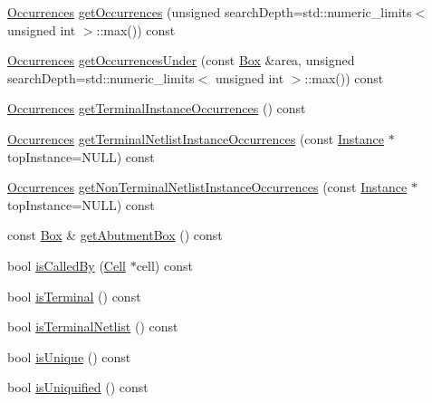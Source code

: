 \begin{DoxyCompactItemize}
\mbox{\hyperlink{namespaceHurricane_a1912927c128eee859af62dbe4cbe0a6b}{Occurrences}} \mbox{\hyperlink{classHurricane_1_1Cell_ab5bbab0a59106855d61deb94805e6115}{get\+Occurrences}} (unsigned search\+Depth=std\+::numeric\+\_\+limits$<$ unsigned int $>$\+::max()) const
\item 
\mbox{\hyperlink{namespaceHurricane_a1912927c128eee859af62dbe4cbe0a6b}{Occurrences}} \mbox{\hyperlink{classHurricane_1_1Cell_a7fb09c8e350923c47ce4c4407bdb00ce}{get\+Occurrences\+Under}} (const \mbox{\hyperlink{classHurricane_1_1Box}{Box}} \&area, unsigned search\+Depth=std\+::numeric\+\_\+limits$<$ unsigned int $>$\+::max()) const
\item 
\mbox{\hyperlink{namespaceHurricane_a1912927c128eee859af62dbe4cbe0a6b}{Occurrences}} \mbox{\hyperlink{classHurricane_1_1Cell_a30b71d9a35ff4e0b59b98ef515f26fc0}{get\+Terminal\+Instance\+Occurrences}} () const
\item 
\mbox{\hyperlink{namespaceHurricane_a1912927c128eee859af62dbe4cbe0a6b}{Occurrences}} \mbox{\hyperlink{classHurricane_1_1Cell_a6f559f7dab6e4afc0b60eba064c5e474}{get\+Terminal\+Netlist\+Instance\+Occurrences}} (const \mbox{\hyperlink{classHurricane_1_1Instance}{Instance}} $\ast$top\+Instance=N\+U\+LL) const
\item 
\mbox{\hyperlink{namespaceHurricane_a1912927c128eee859af62dbe4cbe0a6b}{Occurrences}} \mbox{\hyperlink{classHurricane_1_1Cell_a9e7a0536ec1efb23be2764068a85b6a7}{get\+Non\+Terminal\+Netlist\+Instance\+Occurrences}} (const \mbox{\hyperlink{classHurricane_1_1Instance}{Instance}} $\ast$top\+Instance=N\+U\+LL) const
\item 
const \mbox{\hyperlink{classHurricane_1_1Box}{Box}} \& \mbox{\hyperlink{classHurricane_1_1Cell_a142360ca7b3c1c637894f5b9a2cac069}{get\+Abutment\+Box}} () const
\item 
bool \mbox{\hyperlink{classHurricane_1_1Cell_a239354e1b4ad9b751abf5a064e43b0e6}{is\+Called\+By}} (\mbox{\hyperlink{classHurricane_1_1Cell}{Cell}} $\ast$cell) const
\item 
bool \mbox{\hyperlink{classHurricane_1_1Cell_aac4e9218b7806f3a0f2d5a55f00abd69}{is\+Terminal}} () const
\item 
bool \mbox{\hyperlink{classHurricane_1_1Cell_a6fe2b5a80d4b344733416b25ea559497}{is\+Terminal\+Netlist}} () const
\item 
bool \mbox{\hyperlink{classHurricane_1_1Cell_a6c2f2fd9f6f6e0578937a90c0c37a507}{is\+Unique}} () const
\item 
bool \mbox{\hyperlink{classHurricane_1_1Cell_a86c21867e9ce896eae72fd2999ce8a2d}{is\+Uniquified}} () const

\end{DoxyCompactItemize}
